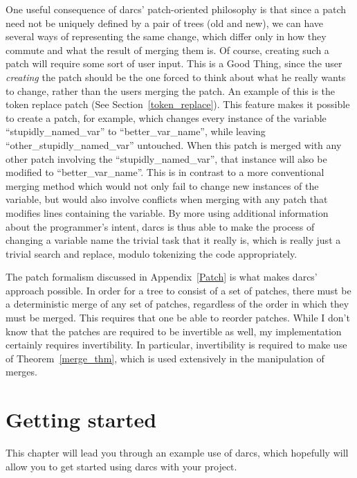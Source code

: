 \documentclass{book}
\begin{document}
One useful consequence of darcs' patch-oriented philosophy is that since a
patch need not be uniquely defined by a pair of trees (old and new), we can
have several ways of representing the same change, which differ only in how
they commute and what the result of merging them is.  Of course, creating
such a patch will require some sort of user input.  This is a Good Thing,
since the user \emph{creating} the patch should be the one forced to think
about what he really wants to change, rather than the users merging the
patch.  An example of this is the token replace patch (See
Section~\ref{token_replace}).  This feature makes it possible to create a
patch, for example, which changes every instance of the variable
``stupidly\_named\_var'' to ``better\_var\_name'', while leaving
``other\_stupidly\_named\_var'' untouched.  When this patch is merged with
any other patch involving the ``stupidly\_named\_var'', that instance will
also be modified to ``better\_var\_name''.  This is in contrast to a more
conventional merging method which would not only fail to change new
instances of the variable, but would also involve conflicts when merging
with any patch that modifies lines containing the variable.  By more using
additional information about the programmer's intent, darcs is thus able to
make the process of changing a variable name the trivial task that it
really is, which is really just a trivial search and replace, modulo
tokenizing the code appropriately.

The patch formalism discussed in Appendix~\ref{Patch} is what makes darcs'
approach possible.  In order for a tree to consist of a set of patches,
there must be a deterministic merge of any set of patches, regardless of the
order in which they must be merged.  This requires that one be able to
reorder patches.  While I don't know that the patches are required to be
invertible as well, my implementation certainly requires invertibility.  In
particular, invertibility is required to make use of
Theorem~\ref{merge_thm}, which is used extensively in the manipulation of
merges.



\chapter{Getting started}

This chapter will lead you through an example use of darcs, which hopefully
will allow you to get started using darcs with your project.
\end{document}
